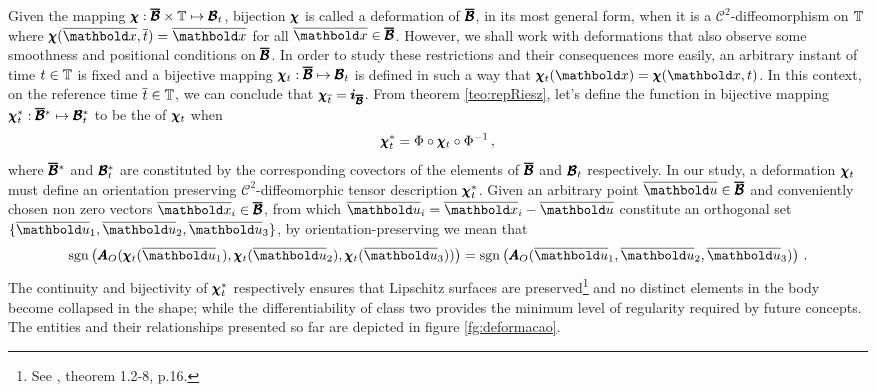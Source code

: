 Given the mapping $\pmb{\chi} : \pmb{\overline{\mathcal{B}}}\times\mathbb{T} \mapsto \pmb{\mathcal{B}}_t$, bijection $\pmb{\chi}$ is called a deformation of $\pmb{\overline{\mathcal{B}}}$, in its most general form, when it is a $\mathcal{C}^{2}$-diffeomorphism on $\mathbb{T}$ where $\fua{\tnr{\chi}}{\overline{\vto{x}},\overline{t}}=\overline{\vto{x}}$ for all $\overline{\vto{x}}\in\tnr{\overline{\mathcal{B}}}$. However, we shall work with deformations that also observe some smoothness and positional conditions on $\pmb{\overline{\mathcal{B}}}$. In order to study these restrictions and their consequences more easily, an arbitrary instant of time $t\in\mathbb{T}$ is fixed and a bijective mapping $\pmb{\chi}_t : \pmb{\overline{\mathcal{B}}} \mapsto \pmb{\mathcal{B}}_t$ is defined in such a way that $\fua{\tnr{\chi}_t}{\vto{x}}=\fua{\tnr{\chi}}{\vto{x},t}$. In this context, on the reference time $\overline{t}\in\mathbb{T}$, we can conclude that $\pmb{\chi}_{\overline{t}}=\pmb{i}_{\pmb{\overline{\mathcal{B}}}}$. From theorem \ref{teo:repRiesz}, let's define the function in bijective mapping $\pmb{\chi}_t^* : \pmb{\overline{\mathcal{B}}}^* \mapsto \pmb{\mathcal{B}}_t^*$ to be the  of $\pmb{\chi}_t$ when
\begin{equation}
\pmb{\chi}_t^* = \Phi\circ\pmb{\chi}_t\circ\Phi^{-1}\,,
\end{equation} 
 where $\pmb{\overline{\mathcal{B}}}^*$ and $\pmb{\mathcal{B}}_t^*$ are constituted by the corresponding covectors of the elements of $\pmb{\overline{\mathcal{B}}}$ and $\pmb{\mathcal{B}}_t$ respectively. In our study, a deformation $\pmb{\chi}_t$ must define an orientation preserving $\mathcal{C}^{2}$-diffeomorphic tensor description $\pmb{\chi}_t^*$. Given an arbitrary point $\overline{\vto{u}}\in\tnr{\overline{\mathcal{B}}}$ and conveniently chosen non zero vectors $\overline{\vto{x}}_i\in\tnr{\overline{\mathcal{B}}}$, from which $\overline{\vto{u}}_i=\overline{\vto{x}}_i-\overline{\vto{u}}$ constitute an orthogonal set $\{ \overline{\vto{u}}_1,\overline{\vto{u}}_2,\overline{\vto{u}}_3\}$, by orientation-preserving we mean that   
\begin{equation}
\sgn{\fua{\tnr{A}_O}{\fua{\tnr{\chi}_t}{\overline{\vto{u}}_1},\fua{\tnr{\chi}_t}{\overline{\vto{u}}_2},\fua{\tnr{\chi}_t}{\overline{\vto{u}}_3}}}=\sgn{\fua{\tnr{A}_O}{\overline{\vto{u}}_1,\overline{\vto{u}}_2,\overline{\vto{u}}_3}}\,.
\end{equation}
The continuity and bijectivity of $\pmb{\chi}_t^*$ respectively ensures that Lipschitz surfaces are preserved\footnote{See \cite{ciarlet_1988_2_2}, theorem 1.2-8, p.16.} and no distinct elements in the body become collapsed in the shape; while the differentiability of class two provides the minimum level of regularity required by future concepts. The entities and their relationships presented so far are depicted in figure \ref{fg:deformacao}. 
